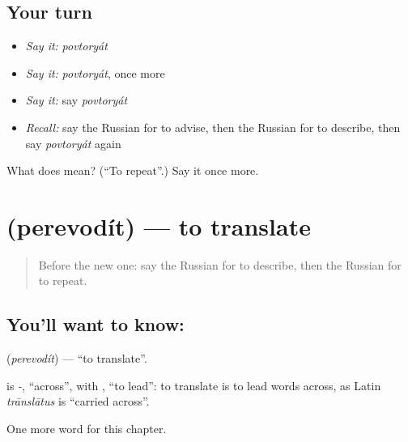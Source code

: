 \subsection*{Your turn}
\begin{itemize}
\raggedright
  \item \emph{Say it:} \emph{povtoryát}
  \item \emph{Say it:} \emph{povtoryát}, once more
  \item \emph{Say it:} say \emph{povtoryát}
  \item \emph{Recall:} say the Russian for to advise, then the Russian for to describe, then say \emph{povtoryát} again
\end{itemize}

\begin{tcolorbox}[breakable,colback=teal!4,colframe=teal!35!black,title={Before you move on}]
What does  mean? (\textquotedblleft{}To repeat\textquotedblright{}.) Say it once more.
\end{tcolorbox}
\section[\texorpdfstring{\ru{переводить} (perevodít)}{переводить (perevodít)}]{ (perevodít) — to translate}

\label{lesson:RU-C174-perevodit}



\begin{quote}
Before the new one: say the Russian for to describe, then the Russian for to repeat.
\end{quote}

\subsection*{You'll want to know: }
\textbf{} (\emph{perevodít}) — \textquotedblleft{}to translate\textquotedblright{}.

\begin{cousinweb}
\textbf{} is \emph{-}, \textquotedblleft{}across\textquotedblright{}, with \emph{}, \textquotedblleft{}to lead\textquotedblright{}: to translate is to lead words across, as Latin \emph{trānslātus} is \textquotedblleft{}carried across\textquotedblright{}.
\end{cousinweb}

\begin{grammarlens}[title={What you've built}]
One more word for this chapter.
\end{grammarlens}

